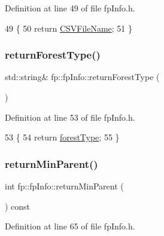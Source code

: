 Definition at line 49 of file fp\+Info.\+h.


\begin{DoxyCode}
49                                                  \{
50                 \textcolor{keywordflow}{return} \hyperlink{classfp_1_1fpInfo_aac01e5ddb27bc333e172a0422066af1c}{CSVFileName};
51             \}
\end{DoxyCode}
\mbox{\label{classfp_1_1fpInfo_a97280e7e3cadc5e653d8ef256eb2c82d}} 
\subsubsection{\texorpdfstring{return\+Forest\+Type()}{returnForestType()}}
{\footnotesize\ttfamily std\+::string\& fp\+::fp\+Info\+::return\+Forest\+Type (\begin{DoxyParamCaption}{ }\end{DoxyParamCaption})\hspace{0.3cm}{\ttfamily [inline]}}



Definition at line 53 of file fp\+Info.\+h.


\begin{DoxyCode}
53                                                 \{
54                 \textcolor{keywordflow}{return} \hyperlink{classfp_1_1fpInfo_a3001fbf80d86022e53578d6adf133b90}{forestType};
55             \}
\end{DoxyCode}
\mbox{\label{classfp_1_1fpInfo_a64d8c3c57e3684a8dd829ed12ddcec0f}} 
\subsubsection{\texorpdfstring{return\+Min\+Parent()}{returnMinParent()}}
{\footnotesize\ttfamily int fp\+::fp\+Info\+::return\+Min\+Parent (\begin{DoxyParamCaption}{ }\end{DoxyParamCaption}) const\hspace{0.3cm}{\ttfamily [inline]}}



Definition at line 65 of file fp\+Info.\+h.


